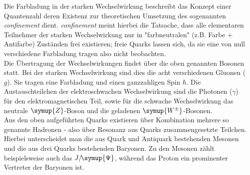 Die Farbladung in der starken Wechselwirkung beschreibt das Konzept einer Quantenzahl deren Existenz zur theoretischen Umsetzung des sogenannten \textit{confinement} dient. \textit{confinement} meint hierbei die Tatsache, dass alle elementaren Teilnehmer der starken Wechselwirkung nur in "farbneutralen" (z.B. Farbe + Antifarbe) Zuständen frei existieren; freie Quarks lassen sich, da sie eine von null verschiedene Farbladung tragen also nicht beobachten.\\
%
Die Übertragung der Wechselwirkungen findet über die oben genannten Bosonen statt. Bei der starken Wechselwirkung sind dies die acht verschiedenen Gluonen ($g$). Sie tragen eine Farbladung und einen ganzzahligen Spin $\hbar$. Die Austauschteilchen der elektroschwachen Wechselwirkung sind die Photonen ($\gamma$) für den elektromagnetischen Teil, sowie für die schwache Wechselwirkung das neutrale $\symup{Z}$-Boson und die geladenen $\symup{W^{\pm}}$-Bosonen. \\
%
Aus den oben aufgeführten Quarks existieren über Kombination mehrere so genannte Hadronen - also über Resonanz aus Quarks zusammengesetzte Teilchen. Hierbei unterscheidet man die aus Quark und Antiquark bestehenden Mesonen und die aus drei Quarks bestehenden Baryonen. Zu den Mesonen zählt beispielsweise auch das $J/\!\symup{\Psi}$, während das Proton ein prominenter Vertreter der Baryonen ist.
